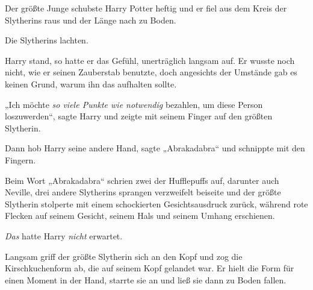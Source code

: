 Der größte Junge schubste Harry Potter heftig und er fiel aus dem Kreis der Slytherins raus und der Länge nach zu Boden.

Die Slytherins lachten.

Harry stand, so hatte er das Gefühl, unerträglich langsam auf. Er wusste noch nicht, wie er seinen Zauberstab benutzte, doch angesichts der Umstände gab es keinen Grund, warum ihn das aufhalten sollte.

„Ich möchte \emph{so viele Punkte wie notwendig} bezahlen, um diese Person loszuwerden“, sagte Harry und zeigte mit seinem Finger auf den größten Slytherin.

Dann hob Harry seine andere Hand, sagte „Abrakadabra“ und schnippte mit den Fingern.

Beim Wort „Abrakadabra“ schrien zwei der Hufflepuffs auf, darunter auch Neville, drei andere Slytherins sprangen verzweifelt beiseite und der größte Slytherin stolperte mit einem schockierten Gesichtsausdruck zurück, während rote Flecken auf seinem Gesicht, seinem Hals und seinem Umhang erschienen.

\emph{Das} hatte Harry \emph{nicht} erwartet.

Langsam griff der größte Slytherin sich an den Kopf und zog die Kirschkuchenform ab, die auf seinem Kopf gelandet war. Er hielt die Form für einen Moment in der Hand, starrte sie an und ließ sie dann zu Boden fallen.

